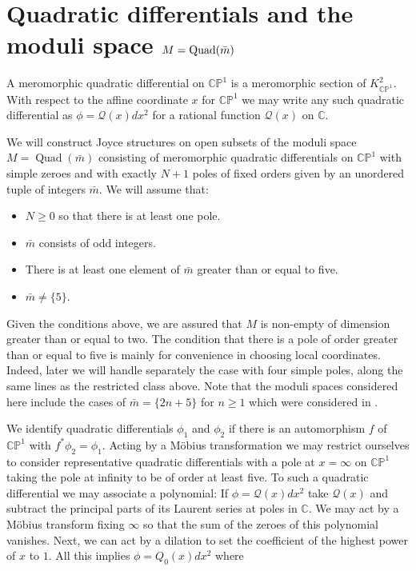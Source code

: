 \documentclass[a4paper,12pt,reqno]{amsart}
\numberwithin{equation}{section}
\numberwithin{counter2}{section}
\begin{document}
\section{Quadratic differentials and the moduli space $M = {\rm Quad}(\bar{m})$}\label{M_defn}
A meromorphic quadratic differential on $\mathbb{CP}^1$ is a meromorphic section of $K_{\mathbb{CP}^1}^2$.  With respect to the affine coordinate $x$ for $\mathbb{CP}^1$ we may write any such quadratic differential as $\phi = \mathcal{Q}(x) dx^2$ for a rational function $\mathcal{Q}(x)$ on $\mathbb{C}$.  \par 
We will construct Joyce structures on open subsets of the moduli space $M = \operatorname{Quad}(\bar{m})$ consisting of meromorphic quadratic differentials on $\mathbb{CP}^1$ with simple zeroes and with exactly $N+1$ poles of fixed orders given by an unordered tuple of integers $\bar{m}$.  We will assume that:
\begin{itemize}
\item $N \ge 0$ so that there is at least one pole.  
\item $\bar{m}$ consists of odd integers.
\item There is at least one element of $\bar{m}$ greater than or equal to five.  
\item $\bar{m} \ne \{5\}$. 
\end{itemize} 
Given the conditions above,  we are assured that $M$ is non-empty of dimension greater than or equal to two.   
 The condition that there is a pole of order greater than or equal to five is mainly for convenience in choosing local coordinates.  Indeed,  later we will handle separately the case with four simple poles,  along the same lines as the restricted class above.  Note that the moduli spaces considered here include the cases of $\bar{m} = \{2n + 5\}$ for $n \ge 1$ which were considered in \cite{DM24}. \par
We identify quadratic differentials $\phi_1$ and $\phi_2$ if there is an automorphism $f$ of $\mathbb{CP}^1$ with $f^*\phi_2 = \phi_1$.  Acting by a M\"obius transformation we may restrict ourselves to consider representative quadratic differentials with a pole at $x = \infty$ on $\mathbb{CP}^1$ taking the pole at infinity to be of order at least five.  To such a quadratic differential we may associate a polynomial: If $\phi = \mathcal{Q}(x)dx^2$ take $\mathcal{Q}(x)$ and subtract the principal parts of its Laurent series at poles in $\mathbb{C}$.  We may act by a M\"obius transform fixing $\infty$ so that the sum of the zeroes of this polynomial vanishes.  Next,  we can act by a dilation to set the coefficient of the highest power of $x$ to $1$.  All this implies $\phi = Q_0(x) dx^2$ where
\end{document}
